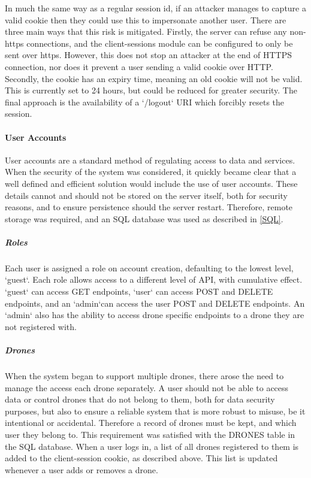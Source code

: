 \documentclass{article}
\begin{document}
In much the same way as a regular session id, if an attacker manages to capture a valid cookie then they could use this to impersonate another user. There are three main ways that this risk is mitigated. Firstly, the server can refuse any non-https connections, and the client-sessions module can be configured to only be sent over https. However, this does not stop an attacker at the end of HTTPS connection, nor does it prevent a user sending a valid cookie over HTTP. Secondly, the cookie has an expiry time, meaning an old cookie will not be valid. This is currently set to 24 hours, but could be reduced for greater security\cite{mozillaClientSessions}. The final approach is the availability of a `/logout` URI which forcibly resets the session. 


\paragraph{User Accounts}
User accounts are a standard method of regulating access to data and services. When the security of the system was considered, it quickly became clear that a well defined and efficient solution would include the use of user accounts. These details cannot and should not be stored on the server itself, both for security reasons, and to ensure persistence should the server restart. Therefore, remote storage was required, and an SQL database was used as described in \ref{SQL}.

\subparagraph{Roles}
Each user is assigned a role on account creation, defaulting to the lowest level, `guest`. Each role allows access to a different level of API, with cumulative effect. `guest` can access GET endpoints, `user` can access POST and DELETE endpoints, and an `admin`can access the user POST and DELETE endpoints. An `admin` also has the ability to access drone specific endpoints to a drone they are not registered with. 

\subparagraph{Drones}
When the system began to support multiple drones, there arose the need to manage the access each drone separately. A user should not be able to access data or control drones that do not belong to them, both for data security purposes, but also to ensure a reliable system that is more robust to misuse, be it intentional or accidental. Therefore a record of drones must be kept, and which user they belong to. This requirement was satisfied with the DRONES table in the SQL database. When a user logs in, a list of all drones registered to them is added to the client-session cookie, as described above. This list is updated whenever a user adds or removes a drone. 
\end{document}
